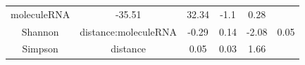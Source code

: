 \documentclass[]{article}
\begin{document}
\begin{longtable}[]{@{}cccccc@{}}
\begin{minipage}[t]{0.24\columnwidth}
moleculeRNA\strut
\end{minipage} & \begin{minipage}[t]{0.11\columnwidth}\centering\strut
-35.51\strut
\end{minipage} & \begin{minipage}[t]{0.14\columnwidth}\centering\strut
32.34\strut
\end{minipage} & \begin{minipage}[t]{0.12\columnwidth}\centering\strut
-1.1\strut
\end{minipage} & \begin{minipage}[t]{0.09\columnwidth}\centering\strut
0.28\strut
\end{minipage}\tabularnewline
\begin{minipage}[t]{0.12\columnwidth}\centering\strut
Shannon\strut
\end{minipage} & \begin{minipage}[t]{0.24\columnwidth}\centering\strut
distance:moleculeRNA\strut
\end{minipage} & \begin{minipage}[t]{0.11\columnwidth}\centering\strut
-0.29\strut
\end{minipage} & \begin{minipage}[t]{0.14\columnwidth}\centering\strut
0.14\strut
\end{minipage} & \begin{minipage}[t]{0.12\columnwidth}\centering\strut
-2.08\strut
\end{minipage} & \begin{minipage}[t]{0.09\columnwidth}\centering\strut
0.05\strut
\end{minipage}\tabularnewline
\begin{minipage}[t]{0.12\columnwidth}\centering\strut
Simpson\strut
\end{minipage} & \begin{minipage}[t]{0.24\columnwidth}\centering\strut
distance\strut
\end{minipage} & \begin{minipage}[t]{0.11\columnwidth}\centering\strut
0.05\strut
\end{minipage} & \begin{minipage}[t]{0.14\columnwidth}\centering\strut
0.03\strut
\end{minipage} & \begin{minipage}[t]{0.12\columnwidth}\centering\strut
1.66\strut
\end{minipage} & \begin{minipage}[t]{0.09\columnwidth}\centering\strut

\end{minipage}
\end{longtable}
\end{document}
